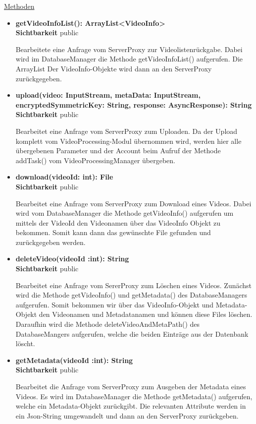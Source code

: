 \underline{Methoden}
\begin{itemize}
\itemsep0pt
\item \textbf{getVideoInfoList(): ArrayList<VideoInfo>}\hfill\\
\textbf{Sichtbarkeit} public

Bearbeitete eine Anfrage vom ServerProxy zur Videolistenrückgabe. Dabei wird im DatabaseManager die Methode getVideoInfoList() aufgerufen. Die ArrayList Der VideoInfo-Objekte wird dann an den ServerProxy zurückgegeben.    

\item \textbf{upload(video: InputStream, metaData: InputStream,
encryptedSymmetricKey: String, response: AsyncResponse): String}\hfill\\
\textbf{Sichtbarkeit} public

Bearbeitet eine Anfrage vom ServerProxy zum Uploaden. Da der Upload komplett vom VideoProcessing-Modul übernommen wird, werden hier alle übergebenen Parameter und der Account beim Aufruf der Methode addTask() vom VideoProcessingManager übergeben.

\item \textbf{download(videoId: int): File}\hfill\\
\textbf{Sichtbarkeit} public

Bearbeitet eine Anfrage vom ServerProxy zum Download eines Videos. Dabei wird vom DatabaseManager die Methode getVideoInfo() aufgerufen um mittels der VideoId den Videonamen über das VideoInfo Objekt zu bekommen. Somit kann dann das gewünschte File gefunden und zurückgegeben werden.

\item \textbf{deleteVideo(videoId :int): String}\hfill\\
\textbf{Sichtbarkeit} public

Bearbeitet eine Anfrage vom SererProxy zum Löschen eines Videos. Zunächst wird die Methode getVideoInfo() und getMetadata() des DatabaseManagers aufgerufen. Somit bekommen wir über das VideoInfo-Objekt und Metadata-Objekt den Videonamen und Metadatanamen und können diese Files löschen. Daraufhin wird die Methode deleteVideoAndMetaPath() des DatabaseMangers aufgerufen, welche die beiden Einträge aus der Datenbank löscht.

\item \textbf{getMetadata(videoId :int): String}\hfill\\
\textbf{Sichtbarkeit} public

Bearbeitet die Anfrage vom ServerProxy zum Ausgeben der Metadata eines Videos. Es wird im DatabaseManager die Methode getMetadata() aufgerufen, welche ein Metadata-Objekt zurückgibt. Die relevanten Attribute werden in ein Json-String umgewandelt und dann an den ServerProxy zurückgeben.

\end{itemize}